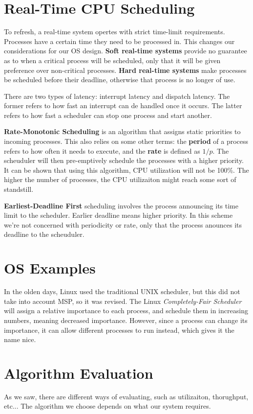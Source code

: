 \documentclass{tufte-handout}
\begin{document}
\section{Real-Time CPU Scheduling}
To refresh, a real-time system opertes with strict time-limit requirements. Processes have 
a certain time they need to be processed in. This changes our considerations for our 
OS design. \textbf{Soft real-time systems} provide no guarantee as to when a critical 
process will be scheduled, only that it will be given preference over non-critical processes.
\textbf{Hard real-time systems} make processes be scheduled before their deadline, otherwise
that process is no longer of use.

There are two types of latency: interrupt latency and dispatch latency. The former refers to 
how fast an interrupt can de handled once it occurs. The latter refers to how fast a scheduler
can stop one process and start another.

\textbf{Rate-Monotonic Scheduling} is an algorithm that assigns static priorities to incoming 
processes. This also relies on some other terms: the \textbf{period} of a process refers to how
often it needs to execute, and the \textbf{rate} is defined as $1/p$. The scheuduler will 
then pre-emptively schedule the processes with a higher priority. It can be shown that using 
this algorithm, CPU utilization will not be 100\%. The higher the number of processes, 
the CPU utilizaiton might reach some sort of standstill.

\textbf{Earliest-Deadline First} scheduling involves the process announcing its time limit 
to the scheduler. Earlier deadline means higher priority. In this scheme we're not concerned
with periodicity or rate, only that the process anounces its deadline to the scheuduler.

\section{OS Examples}
In the olden days, Linux used the traditional UNIX scheduler, but this did not take into 
account MSP, so it was revised. The Linux \textit{Completely-Fair Scheduler} will assign 
a relative importance to each process, and schedule them in increasing numbers, meaning
decreased importance. However, since a process can change its importance, it can allow 
different processes to run instead, which gives it the name nice.

\section{Algorithm Evaluation}
As we saw, there are different ways of evaluating, such as utilizaiton, thorughput, etc...
The algorithm we choose depends on what our system requires.
\end{document}
